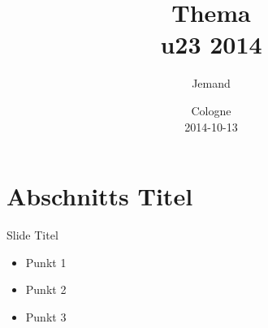 \documentclass[ngerman,compress,aspectratio=169]{beamer}
\title[kurz Thema - u23 2014]
{\textbf{Thema}\\u23 2014}
\author[Jemand <jemand@example.com>]
{Jemand}
\institute[Chaos Computer Club Cologne]
{
Chaos Computer Club Cologne e.V.\\
\url{https://koeln.ccc.de}
}
\date{Cologne\\2014-10-13}
\begin{document}
\begin{frame}
	\titlepage
\end{frame}

\begin{frame}
	\tableofcontents
\end{frame}

\section{Abschnitts Titel}

\begin{frame}{Slide Titel}
	\begin{itemize}
		\item Punkt 1
		\item Punkt 2
		\item Punkt 3
	\end{itemize}
\end{frame}
\end{document}
